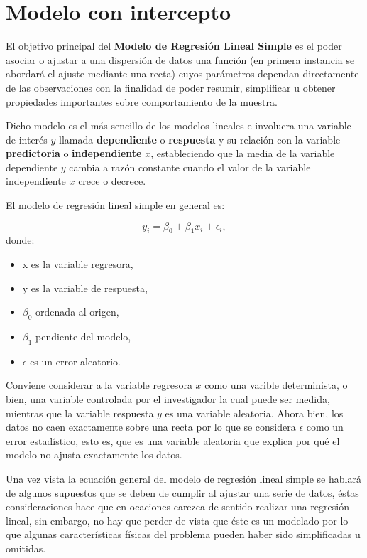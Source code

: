 \documentclass[
  a4paper,
  oneside,
  openany]{book}
\begin{document}
\hypertarget{modelo-con-intercepto}{%
\chapter{Modelo con intercepto}\label{modelo-con-intercepto}}

El objetivo principal del \textbf{Modelo de Regresión Lineal Simple} es el poder asociar o ajustar a una dispersión de datos una función (en primera instancia se abordará el ajuste mediante una recta) cuyos parámetros dependan directamente de las observaciones con la finalidad de poder resumir, simplificar u obtener propiedades importantes sobre comportamiento de la muestra.

Dicho modelo es el más sencillo de los modelos lineales e involucra una variable de interés \(y\) llamada \textbf{dependiente} o \textbf{respuesta} y su relación con la variable \textbf{predictoria} o \textbf{independiente} \(x\), estableciendo que la media de la variable dependiente \(y\) cambia a razón constante cuando el valor de la variable independiente \(x\) crece o decrece.

El modelo de regresión lineal simple en general es:

\[y_{i}=\beta_{0}+\beta_{1}x_{i}+\epsilon_{i},\]
donde:

\begin{itemize}
\item
  x es la variable regresora,
\item
  y es la variable de respuesta,
\item
  \(\beta_{0}\) ordenada al origen,
\item
  \(\beta_{1}\) pendiente del modelo,
\item
  \(\epsilon\) es un error aleatorio.
\end{itemize}

Conviene considerar a la variable regresora \(x\) como una varible determinista, o bien, una variable controlada por el investigador la cual puede ser medida, mientras que la variable respuesta \(y\) es una variable aleatoria. Ahora bien, los datos no caen exactamente sobre una recta por lo que se considera \(\epsilon\) como un error estadístico, esto es, que es una variable aleatoria que explica por qué el modelo no ajusta exactamente los datos.

Una vez vista la ecuación general del modelo de regresión lineal simple se hablará de algunos supuestos que se deben de cumplir al ajustar una serie de datos, éstas consideraciones hace que en ocaciones carezca de sentido realizar una regresión lineal, sin embargo, no hay que perder de vista que éste es un modelado por lo que algunas características físicas del problema pueden haber sido simplificadas u omitidas.
\end{document}
